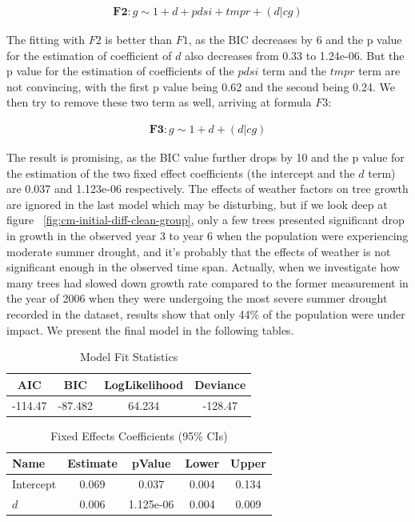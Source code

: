 \documentclass{article}
\begin{document}
\begin{align*}
    \textbf{F2}: g\sim1+d+pdsi+tmpr+(d|cg)
\end{align*}

The fitting with $F2$ is better than $F1$, as the BIC decreases by 6 and the p value for the estimation of coefficient of $d$ also decreases from 0.33 to 1.24e-06. But the p value for the estimation of coefficients of the $pdsi$ term and the $tmpr$ term are not convincing, with the first p value being 0.62 and the second being 0.24. We then try to remove these two term as well, arriving at formula $F3$:

\begin{align*}
    \textbf{F3}: g\sim1+d+(d|cg)
\end{align*}

The result is promising, as the BIC value further drops by 10 and the p value for the estimation of the two fixed effect coefficients (the intercept and the $d$ term) are 0.037 and 1.123e-06 respectively. The effects of weather factors on tree growth are ignored in the last model which may be disturbing, but if we look deep at figure ~\ref{fig:cm-initial-diff-clean-group}, only a few trees presented significant drop in growth in the observed year 3 to year 6 when the population were experiencing moderate summer drought, and it's probably that the effects of weather is not significant enough in the observed time span. Actually, when we investigate how many trees had slowed down growth rate compared to the former measurement in the year of 2006 when they were undergoing the most severe summer drought recorded in the dataset, results show that only 44\% of the population were under impact. We present the final model in the following tables.

\begin{table}[h!]
    \centering
    \begin{tabular}{ |c | c | c | c | } 
        \hline
        AIC& BIC & LogLikelihood & Deviance\\ 
        \hline
        -114.47 & -87.482 & 64.234 & -128.47 \\ 
        \hline
        \end{tabular}
    \caption{Model Fit Statistics}
\end{table}

\begin{table}[h!]
    \centering
    \begin{tabular}{ |l | c | c | c | c | } 
        \hline
        Name& Estimate & pValue & Lower & Upper\\ 
        \hline
        Intercept & 0.069 & 0.037 & 0.004 & 0.134\\
        \hline
        $d$ & 0.006 & 1.125e-06 & 0.004 & 0.009\\
        \hline
        \end{tabular}
    \caption{Fixed Effects Coefficients (95\% CIs)}
\end{table}
\end{document}

